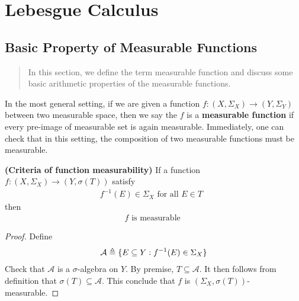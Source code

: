 \documentclass{report}
\begin{document}
\chapter{Lebesgue Calculus}
\section{Basic Property of Measurable Functions}
\begin{abstract}
In this section, we define the term measurable function and discuss some basic arithmetic properties of the measurable functions. 
\end{abstract}
\begin{mdframed}
  In the most general setting, if we are given a function $f:(X,\Sigma_X)\rightarrow (Y,\Sigma_Y)$ between two measurable space, then we say the $f$ is a \textbf{measurable function} if every pre-image of measurable set is again measurable. Immediately, one can check that in this setting, the composition of two measurable functions must be measurable.
\end{mdframed}
\begin{theorem}
\label{EDm}
\textbf{(Criteria of function measurability)} If a function $f:(X,\Sigma_X)\rightarrow (Y,\sigma (T))$ satisfy 
\begin{align*}
f^{-1}(E)\in \Sigma_X\text{ for all $E \in T$ }
\end{align*}
then 
\begin{align*}
f\text{ is measurable }
\end{align*}
\end{theorem}
\begin{proof}
Define 
\begin{align*}
\mathcal{A}\triangleq \{ E \subseteq Y: f^{-1}(E)\in \Sigma_X \}
\end{align*}
Check that $\mathcal{A}$ is a $\sigma$-algebra on $Y$. By premise, $T \subseteq \mathcal{A}$. It then follows from definition that $\sigma (T)\subseteq \mathcal{A}$. This conclude that $f$ is  $(\Sigma_X, \sigma(T))$-measurable. 
\end{proof}
\end{document}
